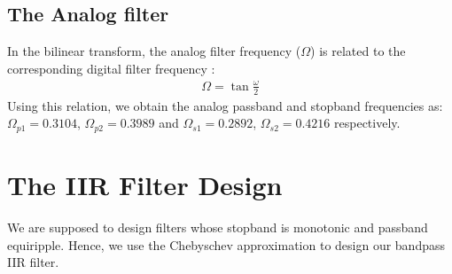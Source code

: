 \documentclass{article}
\begin{document}
\subsection{The Analog filter}
In the bilinear transform, the analog filter frequency ($\Omega$) is related to the corresponding digital filter frequency\brak{\omega} :
\begin{align}
    \Omega = \tan \frac{\omega}{2}
\end{align}
Using this relation, we obtain the analog passband and stopband frequencies as:
$\Omega_{p1} = 0.3104$, $\Omega_{p2} = 0.3989$ and $\Omega_{s1} = 0.2892$, $\Omega_{s2} = 0.4216$
respectively.

\section{The IIR Filter Design}
We are supposed to design filters whose stopband is monotonic and passband equiripple.  
Hence, we use the Chebyschev approximation to design our bandpass IIR filter.
\end{document}
